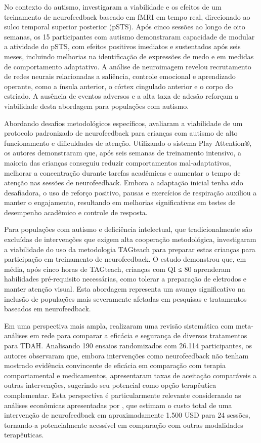 No contexto do autismo,  investigaram a viabilidade e os efeitos de um treinamento de neurofeedback baseado em fMRI em tempo real, direcionado ao sulco temporal superior posterior (pSTS). Após cinco sessões ao longo de oito semanas, os 15 participantes com autismo demonstraram capacidade de modular a atividade do pSTS, com efeitos positivos imediatos e sustentados após seis meses, incluindo melhorias na identificação de expressões de medo e em medidas de comportamento adaptativo. A análise de neuroimagem revelou recrutamento de redes neurais relacionadas a saliência, controle emocional e aprendizado operante, como a ínsula anterior, o córtex cingulado anterior e o corpo do estriado. A ausência de eventos adversos e a alta taxa de adesão reforçam a viabilidade desta abordagem para populações com autismo.

Abordando desafios metodológicos específicos,  avaliaram a viabilidade de um protocolo padronizado de neurofeedback para crianças com autismo de alto funcionamento e dificuldades de atenção. Utilizando o sistema Play Attention®, os autores demonstraram que, após seis semanas de treinamento intensivo, a maioria das crianças conseguiu reduzir comportamentos mal-adaptativos, melhorar a concentração durante tarefas acadêmicas e aumentar o tempo de atenção nas sessões de neurofeedback. Embora a adaptação inicial tenha sido desafiadora, o uso de reforço positivo, pausas e exercícios de respiração auxiliou a manter o engajamento, resultando em melhorias significativas em testes de desempenho acadêmico e controle de resposta.

Para populações com autismo e deficiência intelectual, que tradicionalmente são excluídas de intervenções que exigem alta cooperação metodológica,  investigaram a viabilidade do uso da metodologia TAGteach para preparar estas crianças para participação em treinamento de neurofeedback. O estudo demonstrou que, em média, após cinco horas de TAGteach, crianças com QI ≤ 80 aprenderam habilidades pré-requisito necessárias, como tolerar a preparação de eletrodos e manter atenção visual. Esta abordagem representa um avanço significativo na inclusão de populações mais severamente afetadas em pesquisas e tratamentos baseados em neurofeedback.

Em uma perspectiva mais ampla,  realizaram uma revisão sistemática com meta-análises em rede para comparar a eficácia e segurança de diversos tratamentos para TDAH. Analisando 190 ensaios randomizados com 26.114 participantes, os autores observaram que, embora intervenções como neurofeedback não tenham mostrado evidência convincente de eficácia em comparação com terapia comportamental e medicamentos, apresentaram taxas de aceitação comparáveis a outras intervenções, sugerindo seu potencial como opção terapêutica complementar. Esta perspectiva é particularmente relevante considerando as análises econômicas apresentadas por , que estimam o custo total de uma intervenção de neurofeedback em aproximadamente 1.500 USD para 24 sessões, tornando-a potencialmente acessível em comparação com outras modalidades terapêuticas.

